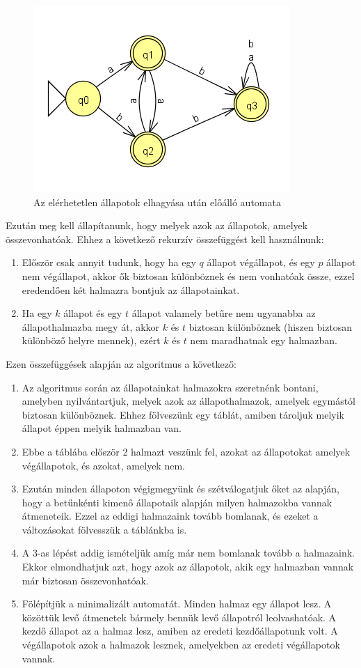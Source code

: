 \documentclass[12pt]{report}
\theoremstyle{definition}
\begin{document}
\begin{figure}[H]
\centering
\includegraphics[scale=0.8]{min_feleselhagyott.png}
\caption{\label{mini2} Az elérhetetlen állapotok elhagyása után előálló automata}
\end{figure}

Ezután meg kell állapítanunk, hogy melyek azok az állapotok, amelyek összevonhatóak. Ehhez a következő rekurzív összefüggést kell használnunk:
\begin{enumerate}
\item Először csak annyit tudunk, hogy ha egy $q$ állapot végállapot, és egy $p$ állapot nem végállapot, akkor ők biztosan különböznek és nem vonhatóak össze, ezzel eredendően két halmazra bontjuk az állapotainkat.
\item Ha egy $k$ állapot és egy $t$ állapot valamely betűre nem ugyanabba az állapothalmazba megy át, akkor $k$ és $t$ biztosan különböznek (hiszen biztosan különböző helyre mennek), ezért $k$ és $t$ nem maradhatnak egy halmazban.
\end{enumerate}

Ezen összefüggések alapján az algoritmus a következő:
\begin{enumerate}
\item Az algoritmus során az állapotainkat halmazokra szeretnénk bontani, amelyben nyilvántartjuk, melyek azok az állapothalmazok, amelyek egymástól biztosan különböznek. Ehhez fölveszünk egy táblát, amiben tároljuk melyik állapot éppen melyik halmazban van.
\item Ebbe a táblába először 2 halmazt veszünk fel, azokat az állapotokat amelyek végállapotok, és azokat, amelyek nem.
\item Ezután minden állapoton végigmegyünk és szétválogatjuk őket az alapján, hogy a betűnkénti kimenő állapotaik alapján milyen halmazokba vannak átmeneteik. Ezzel az eddigi halmazaink tovább bomlanak, és ezeket a változásokat fölvesszük a táblánkba is.
\item A 3-as lépést addig ismételjük amíg már nem bomlanak tovább a halmazaink. Ekkor elmondhatjuk azt, hogy azok az állapotok, akik egy halmazban vannak már biztosan összevonhatóak.
\item Fölépítjük a minimalizált automatát. Minden halmaz egy állapot lesz. A közöttük levő átmenetek bármely bennük levő állapotról leolvashatóak. A kezdő állapot az a halmaz lesz, amiben az eredeti kezdőállapotunk volt. A végállapotok azok a halmazok lesznek, amelyekben az eredeti végállapotok vannak.
\end{enumerate}
\end{document}
